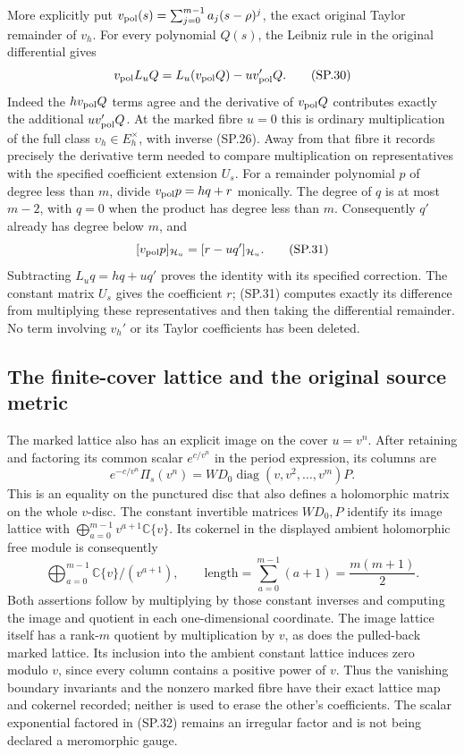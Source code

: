 More explicitly put
\(v_{\rm pol}(s)=\sum_{j=0}^{m-1}a_j(s-\rho)^j\), the exact
original Taylor remainder of \(v_h\). For every polynomial
\(Q(s)\), the Leibniz rule in the original differential gives
\[
 v_{\rm pol}L_uQ
 =L_u(v_{\rm pol}Q)-u v_{\rm pol}'Q.
 \tag{SP.30}\label{CFStage:eq:sp-unitdifferential}
\]
Indeed the \(h v_{\rm pol}Q\) terms agree and the derivative
of \(v_{\rm pol}Q\) contributes exactly the additional
\(u v_{\rm pol}'Q\). At the marked fibre \(u=0\) this is
ordinary multiplication of the full class
\(\upsilon_h\in E_h^\times\), with inverse (SP.26).
Away from that fibre it records precisely the derivative
term needed to compare multiplication on representatives
with the specified coefficient extension \(U_s\).
For a remainder polynomial \(p\) of degree less than \(m\),
divide \(v_{\rm pol}p=hq+r\) monically. The degree of \(q\)
is at most \(m-2\), with \(q=0\) when the product has
degree less than \(m\). Consequently \(q'\) already has
degree below \(m\), and
\[
 [v_{\rm pol}p]_{\mathcal H_u}
       =[r-uq']_{\mathcal H_u}.
 \tag{SP.31}\label{CFStage:eq:sp-unitremainder}
\]
Subtracting \(L_uq=hq+uq'\) proves the identity with its
specified correction. The constant matrix \(U_s\) gives
the coefficient \(r\); (SP.31) computes exactly its
difference from multiplying these representatives and
then taking the differential remainder.
No term involving \(v_h'\) or its Taylor coefficients has
been deleted.

\subsection{The finite-cover lattice and the original source metric}

The marked lattice also has an explicit image on the cover
\(u=v^n\). After retaining and factoring its common scalar
\(e^{c/v^n}\) in the period expression, its columns are
\[
 e^{-c/v^n}\Pi_s(v^n)
 =WD_0\operatorname{diag}(v,v^2,\ldots,v^m)P .
 \tag{SP.32}\label{CFStage:eq:sp-coverlattice}
\]
This is an equality on the punctured disc that also defines
a holomorphic matrix on the whole \(v\)-disc.
The constant invertible matrices \(WD_0,P\) identify its
image lattice with
\(\bigoplus_{a=0}^{m-1}v^{a+1}\mathbb C\{v\}\).
Its cokernel in the displayed ambient holomorphic free
module is consequently
\[
 \bigoplus_{a=0}^{m-1}\mathbb C\{v\}/(v^{a+1}),\qquad
 \text{length}=\sum_{a=0}^{m-1}(a+1)=\frac{m(m+1)}2 .
 \tag{SP.33}\label{CFStage:eq:sp-latticequotient}
\]
Both assertions follow by multiplying by those constant
inverses and computing the image and quotient in each
one-dimensional coordinate. The image lattice itself
has a rank-\(m\) quotient by multiplication by \(v\),
as does the pulled-back marked lattice.
Its inclusion into the ambient constant lattice induces
zero modulo \(v\), since every column contains a positive
power of \(v\). Thus the vanishing boundary invariants
and the nonzero marked fibre have their exact lattice
map and cokernel recorded; neither is used to erase the
other's coefficients. The scalar exponential factored
in (SP.32) remains an irregular factor and is not being
declared a meromorphic gauge.

